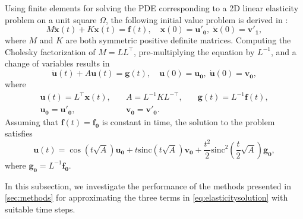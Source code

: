 Using finite elements for solving the PDE corresponding to a 2D linear elasticity problem
on a unit square $\Omega$, the following initial value problem is derived in
\cite{voet2020linearelasticity}:
\begin{equation}
    \label{eq:elasticityequation}
    M \mathbf{\ddot{x}}(t) + K \mathbf{x}(t) = \mathbf{f}(t), \quad
    \mathbf{x}(0) = \mathbf{u'_0}, \; \mathbf{\dot{x}}(0) = \mathbf{v'_1},
\end{equation}
where $M$ and $K$ are both symmetric positive definite matrices.
Computing the Cholesky factorization of $M = LL^{\top}$, pre-multiplying the equation by $L^{-1}$,
and a change of variables results in
\begin{equation}
    \mathbf{\ddot{u}}(t) + A \mathbf{u}(t) = \mathbf{g}(t), \quad
    \mathbf{u}(0) = \mathbf{u_0}, \; \mathbf{\dot{u}}(0) = \mathbf{v_0},
\end{equation}
where
\begin{equation*}
    \begin{aligned}
        & \mathbf{u}(t) = L^{\top} \mathbf{x}(t), \quad & A = L^{-1} K L^{-\top}, \quad & \mathbf{g}(t) = L^{-1} \mathbf{f}(t), & \\
        & \mathbf{u_0} = \mathbf{u'_0}, & \mathbf{v_0} = \mathbf{v'_0}. & &
    \end{aligned}
\end{equation*}
Assuming that $\mathbf{f}(t) = \mathbf{f_0}$ is constant in time, the solution to
the problem satisfies
\begin{equation}
    \label{eq:elasticitysolution}
    \mathbf{u}(t) = \cos(t\sqrt{A}) \mathbf{u_0}
    + t \mathrm{sinc}(t\sqrt{A}) \mathbf{v_0}
    + \frac{t^2}{2} \mathrm{sinc}^2(\frac{t}{2} \sqrt{A}) \mathbf{g_0},
\end{equation}
where $\mathbf{g_0} = L^{-1} \mathbf{f_0}$.

In this subsection, we investigate the performance of the methods presented in \autoref{sec:methods}
for approximating the three terms in \eqref{eq:elasticitysolution} with suitable time steps.


